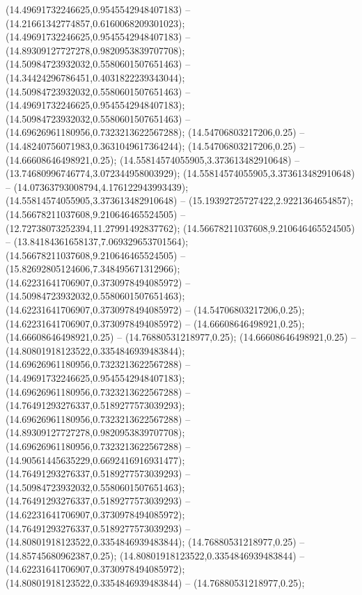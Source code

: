  (14.49691732246625,0.9545542948407183) -- (14.21661342774857,0.6160068209301023);
 (14.49691732246625,0.9545542948407183) -- (14.89309127727278,0.9820953839707708);
 (14.50984723932032,0.5580601507651463) -- (14.34424296786451,0.4031822239343044);
 (14.50984723932032,0.5580601507651463) -- (14.49691732246625,0.9545542948407183);
 (14.50984723932032,0.5580601507651463) -- (14.69626961180956,0.7323213622567288);
 (14.54706803217206,0.25) -- (14.48240756071983,0.3631049617364244);
 (14.54706803217206,0.25) -- (14.66608646498921,0.25);
 (14.55814574055905,3.373613482910648) -- (13.74680996746774,3.072344958003929);
 (14.55814574055905,3.373613482910648) -- (14.07363793008794,4.176122943993439);
 (14.55814574055905,3.373613482910648) -- (15.19392725727422,2.9221364654857);
 (14.56678211037608,9.210646465524505) -- (12.72738073252394,11.27991492837762);
 (14.56678211037608,9.210646465524505) -- (13.84184361658137,7.069329653701564);
 (14.56678211037608,9.210646465524505) -- (15.82692805124606,7.348495671312966);
 (14.62231641706907,0.3730978494085972) -- (14.50984723932032,0.5580601507651463);
 (14.62231641706907,0.3730978494085972) -- (14.54706803217206,0.25);
 (14.62231641706907,0.3730978494085972) -- (14.66608646498921,0.25);
 (14.66608646498921,0.25) -- (14.76880531218977,0.25);
 (14.66608646498921,0.25) -- (14.80801918123522,0.3354846939483844);
 (14.69626961180956,0.7323213622567288) -- (14.49691732246625,0.9545542948407183);
 (14.69626961180956,0.7323213622567288) -- (14.76491293276337,0.5189277573039293);
 (14.69626961180956,0.7323213622567288) -- (14.89309127727278,0.9820953839707708);
 (14.69626961180956,0.7323213622567288) -- (14.90561445635229,0.6692416916931477);
 (14.76491293276337,0.5189277573039293) -- (14.50984723932032,0.5580601507651463);
 (14.76491293276337,0.5189277573039293) -- (14.62231641706907,0.3730978494085972);
 (14.76491293276337,0.5189277573039293) -- (14.80801918123522,0.3354846939483844);
 (14.76880531218977,0.25) -- (14.85745680962387,0.25);
 (14.80801918123522,0.3354846939483844) -- (14.62231641706907,0.3730978494085972);
 (14.80801918123522,0.3354846939483844) -- (14.76880531218977,0.25);
